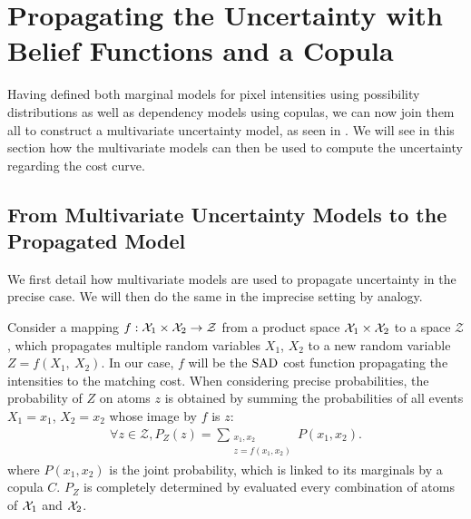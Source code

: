 \section{Propagating the Uncertainty with Belief Functions and a Copula}
Having defined both marginal models for pixel intensities using possibility distributions as well as dependency models using copulas, we can now join them all to construct a multivariate uncertainty model, as seen in . We will see in this section how the multivariate models can then be used to compute the uncertainty regarding the cost curve. 

\subsection{From Multivariate Uncertainty Models to the Propagated Model}
We first detail how multivariate models are used to propagate uncertainty in the precise case. We will then do the same in the imprecise setting by analogy.

Consider a mapping $f:\mathcal{X}_1\times\mathcal{X}_2\rightarrow\mathcal{Z}$ from a product space $\mathcal{X}_1\times\mathcal{X}_2$ to a space $\mathcal{Z}$, which propagates multiple random variables $X_1$, $X_2$ to a new random variable $Z=f(X_1, ~X_2)$. In our case, $f$ will be the $\mathrm{SAD}$ cost function propagating the intensities to the matching cost. When considering precise probabilities, the probability of $Z$ on atoms $z$ is obtained by summing the probabilities of all events $X_1=x_1$, $X_2=x_2$ whose image by $f$ is $z$: 
\begin{align}\label{eq:precise_propagate_proba}
    \forall z\in\mathcal{Z}, P_Z(z)=\sum_{\substack{x_1,x_2\\z=f(x_1,x_2)}}P(x_1,x_2).
\end{align}
where $P(x_1,x_2)$ is the joint probability, which is linked to its marginals by a copula $C$. $P_Z$ is completely determined by evaluated every combination of atoms of $\mathcal{X}_1$ and $\mathcal{X}_2$.

